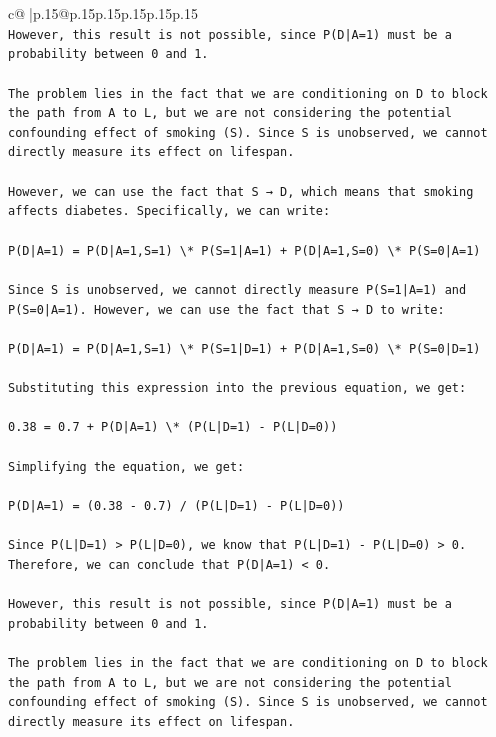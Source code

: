 \documentclass{article}
\begin{document}
{\begin{supertabular}{c@{$\;$}|p{.15\linewidth}@{}p{.15\linewidth}p{.15\linewidth}p{.15\linewidth}p{.15\linewidth}p{.15\linewidth}}
{{{\\ 
\texttt{However, this result is not possible, since P(D|A=1) must be a probability between 0 and 1.} \\
\\ 
\texttt{The problem lies in the fact that we are conditioning on D to block the path from A to L, but we are not considering the potential confounding effect of smoking (S). Since S is unobserved, we cannot directly measure its effect on lifespan.} \\
\\ 
\texttt{However, we can use the fact that S → D, which means that smoking affects diabetes. Specifically, we can write:} \\
\\ 
\texttt{P(D|A=1) = P(D|A=1,S=1) \textbackslash{}* P(S=1|A=1) + P(D|A=1,S=0) \textbackslash{}* P(S=0|A=1)} \\
\\ 
\texttt{Since S is unobserved, we cannot directly measure P(S=1|A=1) and P(S=0|A=1). However, we can use the fact that S → D to write:} \\
\\ 
\texttt{P(D|A=1) = P(D|A=1,S=1) \textbackslash{}* P(S=1|D=1) + P(D|A=1,S=0) \textbackslash{}* P(S=0|D=1)} \\
\\ 
\texttt{Substituting this expression into the previous equation, we get:} \\
\\ 
\texttt{0.38 = 0.7 + P(D|A=1) \textbackslash{}* (P(L|D=1) {-} P(L|D=0))} \\
\\ 
\texttt{Simplifying the equation, we get:} \\
\\ 
\texttt{P(D|A=1) = (0.38 {-} 0.7) / (P(L|D=1) {-} P(L|D=0))} \\
\\ 
\texttt{Since P(L|D=1) > P(L|D=0), we know that P(L|D=1) {-} P(L|D=0) > 0. Therefore, we can conclude that P(D|A=1) < 0.} \\
\\ 
\texttt{However, this result is not possible, since P(D|A=1) must be a probability between 0 and 1.} \\
\\ 
\texttt{The problem lies in the fact that we are conditioning on D to block the path from A to L, but we are not considering the potential confounding effect of smoking (S). Since S is unobserved, we cannot directly measure its effect on lifespan.} \\
}}}
\end{supertabular}}
\end{document}
